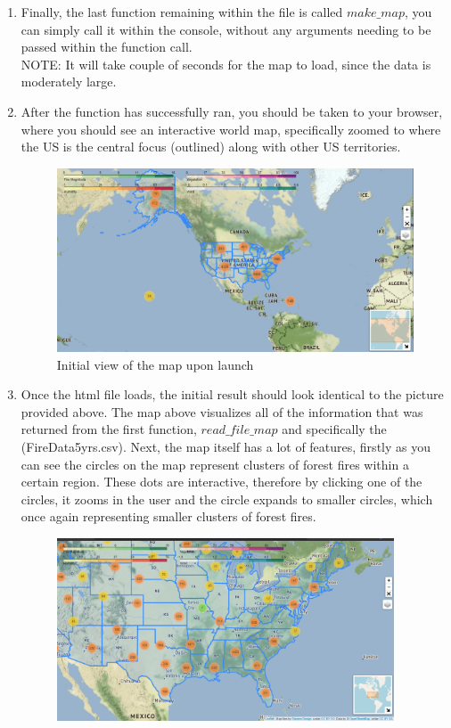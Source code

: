 \documentclass[fontsize=11pt]{article}
\begin{document}
\begin{enumerate}
    \item Finally, the last function remaining within the file is called $make\_map$, you can simply call it within the console, without any arguments needing to be passed within the function call. \\
    NOTE: It will take couple of seconds for the map to load, since the data is moderately large.
    \item After the function has successfully ran, you should be taken to your browser, where you should see an interactive world map, specifically zoomed to where the US is the central focus (outlined) along with other US territories.\\
    \begin{figure}[h]
            \centering
            \includegraphics[width = 16cm ]{fullmapgood.png}
            \caption{Initial view of the map upon launch}
            \label{fig:my_label}
        \end{figure}
    \item Once the html file loads, the initial result should look identical to the picture provided above. The map above visualizes all of the information that was returned from the first function, $ read\_file\_map $ and specifically the (FireData5yrs.csv). Next, the map itself has a lot of features, firstly as you can see the circles on the map represent clusters of forest fires within a certain region. These dots are interactive, therefore by clicking one of the circles, it zooms in the user and the circle expands to smaller circles, which once again representing smaller clusters of forest fires.\\
    \begin{figure}[h]
            \centering
            \includegraphics[width = 10cm ]{zoom1.png}

\end{figure}
\end{enumerate}
\end{document}
